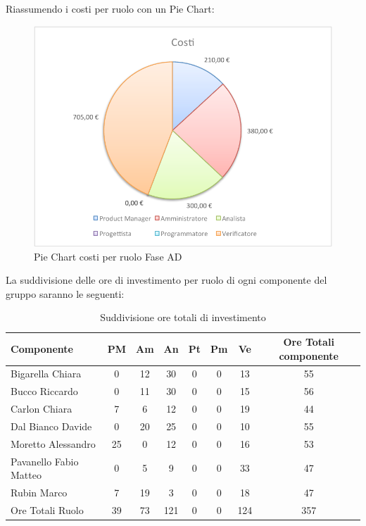 				Riassumendo i costi per ruolo con un Pie Chart:
				\begin{figure}[H]\centering
					\includegraphics[width=\textwidth]{PianoDiProgetto/Pics/ChartTotCostiFaseAD.pdf}
					\caption{Pie Chart costi per ruolo Fase AD}
				\end{figure}		
				La suddivisione delle ore di investimento per ruolo di ogni componente del gruppo \groupname{} saranno le seguenti:
				\begin{table}[H]
					\begin{center}
						\begin{tabular}{| l | c | c | c | c | c | c | c |}
							\hline
							Componente 				& PM	& Am 	& An 	& Pt 		& Pm 	& Ve 	& Ore Totali componente \\ \hline
							
							Bigarella Chiara 			& 0		& 12 		& 30 		& 0		& 0		& 13 		& 55 \\
							Bucco Riccardo 				& 0		& 11 		& 30 		& 0		& 0		& 15 		& 56 \\
							Carlon Chiara	 			& 7 	& 6 		& 12 		& 0		& 0		& 19 		& 44 \\
							Dal Bianco Davide 			& 0		& 20 		& 25 		& 0		& 0		& 10 		& 55 \\
							Moretto Alessandro 			& 25 	& 0			& 12 		& 0		& 0		& 16 		& 53 \\
							Pavanello Fabio Matteo	 	& 0		& 5 		& 9 		& 0		& 0		& 33 		& 47 \\
							Rubin Marco					& 7 	& 19 		& 3 		& 0		& 0		& 18 		& 47 \\ \hline \hline
							
							Ore Totali Ruolo 			& 39 	& 73 		& 121	 	& 0		& 0		& 124 		& 357\\ \hline
						\end{tabular}
					\end{center}
					\caption{Suddivisione ore totali di investimento}
				\end{table}

